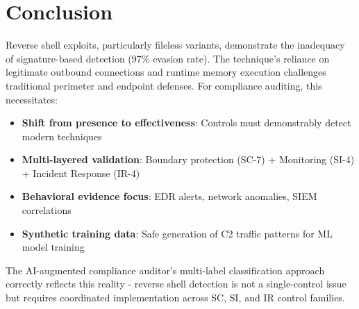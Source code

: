 \documentclass[11pt,conference]{IEEEtran}
\begin{document}
\section{Conclusion}

Reverse shell exploits, particularly fileless variants, demonstrate the inadequacy of signature-based detection (97\% evasion rate). The technique's reliance on legitimate outbound connections and runtime memory execution challenges traditional perimeter and endpoint defenses. For compliance auditing, this necessitates:

\begin{itemize}
    \item \textbf{Shift from presence to effectiveness}: Controls must demonstrably detect modern techniques
    \item \textbf{Multi-layered validation}: Boundary protection (SC-7) + Monitoring (SI-4) + Incident Response (IR-4)
    \item \textbf{Behavioral evidence focus}: EDR alerts, network anomalies, SIEM correlations
    \item \textbf{Synthetic training data}: Safe generation of C2 traffic patterns for ML model training
\end{itemize}

The AI-augmented compliance auditor's multi-label classification approach correctly reflects this reality - reverse shell detection is not a single-control issue but requires coordinated implementation across SC, SI, and IR control families.
\end{document}
